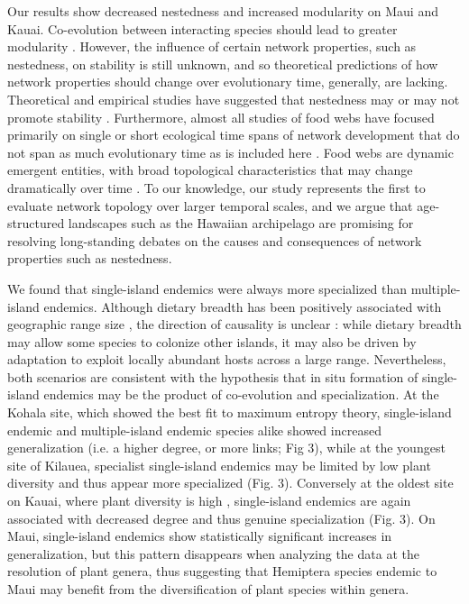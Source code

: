 Our results show decreased nestedness and increased modularity on Maui
and Kauai. Co-evolution between interacting species should lead to
greater modularity \citep{donatti2011, nuismer2013}. However, the
influence of certain network properties, such as nestedness, on
stability is still unknown, and so theoretical predictions of how
network properties should change over evolutionary time, generally,
are lacking. Theoretical and empirical studies have suggested that
nestedness may or may not promote stability \citep{allesina2012,
suweis2014}. Furthermore, almost all studies of food webs have focused
primarily on single or short ecological time spans of network
development that do not span as much evolutionary time as is included
here \citep[e.g.][]{albrecht2010}. Food webs are dynamic emergent
entities, with broad topological characteristics that may change
dramatically over time \citep[e.g.][]{yeakel2013}. To our knowledge,
our study represents the first to evaluate network topology over
larger temporal scales, and we argue that age-structured landscapes
such as the Hawaiian archipelago are promising for resolving
long-standing debates on the causes and consequences of network
properties such as nestedness.

We found that single-island endemics were always more specialized than
multiple-island endemics. Although dietary breadth has been positively
associated with geographic range size \citep{lewinsohn2005}, the
direction of causality is unclear \citep{slatyer2013}: while dietary
breadth may allow some species to colonize other islands, it may also
be driven by adaptation to exploit locally abundant hosts across a
large range. Nevertheless, both scenarios are consistent with the
hypothesis that in situ formation of single-island endemics may be the
product of co-evolution and specialization. At the Kohala site, which
showed the best fit to maximum entropy theory, single-island endemic
and multiple-island endemic species alike showed increased
generalization (i.e. a higher degree, or more links; Fig 3), while at
the youngest site of Kilauea, specialist single-island endemics may be
limited by low plant diversity and thus appear more specialized
(Fig. 3). Conversely at the oldest site on Kauai, where plant
diversity is high \citep{kitayama1995}, single-island endemics are
again associated with decreased degree and thus genuine specialization
(Fig. 3). On Maui, single-island endemics show statistically
significant increases in generalization, but this pattern disappears
when analyzing the data at the resolution of plant genera, thus
suggesting that Hemiptera species endemic to Maui may benefit from the
diversification of plant species within genera.


